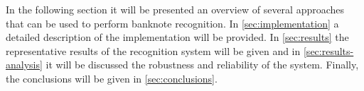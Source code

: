 In the following section it will be presented an overview of several approaches that can be used to perform banknote recognition. In \cref{sec:implementation} a detailed description of the implementation will be provided. In \cref{sec:results} the representative results of the recognition system will be given and in \cref{sec:results-analysis} it will be discussed the robustness and reliability of the system. Finally, the conclusions will be given in \cref{sec:conclusions}.
